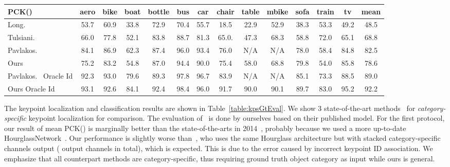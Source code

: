 \documentclass[runningheads]{llncs}
\begin{document}
\begin{center}
\begin{table*}[t]
\scriptsize
\centering
\begin{tabular}{l|cccccccccccc|c}
\hline
PCK() & {{}aero} & {{}bike} & {{}boat} & {{}bottle} & {{}bus} & {{}car} & {{}chair} & {{}table} & {{}mbike} & {{}sofa} & {{}train} & { {}tv} & {mean} \\
\hline
{{}{Long. \cite{long2014convnets}}} & 53.7 & 60.9 & 33.8 & 72.9 & 70.4 & 55.7 & 18.5 & 22.9 & 52.9 & 38.3 & 53.3 & 49.2 & 48.5 \\
{Tulsiani.~\cite{tulsiani2015viewpoints}} & 66.0 & 77.8 & 52.1 & 83.8 & 88.7 & 81.3 & 65.0.& 47.3 & 68.3 & 58.8 & 72.0 & 65.1 & 68.8 \\
{Pavlakos.~\cite{pavlakos20176}} & 84.1 & 86.9 & 62.3 & 87.4 & 96.0 & 93.4 & 76.0 & N/A & N/A & 78.0 & 58.4 & 84.8 & 82.5 \\
Ours & 75.2 & 83.2 & 54.8 & 87.0 & 94.4 & 90.0 & 75.4 & 58.0 & 68.8 & 79.8 & 54.0 & 85.8 & 78.6 \\
\hline
\hline
{Pavlakos.~\cite{pavlakos20176} Oracle Id} & 92.3 & 93.0 & 79.6 & 89.3 & 97.8 & 96.7 & 83.9 & N/A & N/A & 85.1 & 73.3 & 88.5 & 89.0 \\
Ours Oracle Id & 93.1 & 92.6 & 84.1 & 92.4 & 98.4 & 96.0 & 91.7 & 90.0 & 90.1 & 89.7 & 83.0 & 95.2 & 92.2 \\
\hline
\end{tabular}
\caption{2D Keypoint Localization Results. The results are shown in PCK(). Top: our result with nearest canonical feature as keypoint identification. Bottom: results with oracle keypoint identification.}
\label{table:kpsGtEval}
\end{table*}
\end{center}

The keypoint localization and classification results are shown in Table~\ref{table:kpsGtEval}.
We show 3 state-of-the-art methods~\cite{long2014convnets,tulsiani2015viewpoints,pavlakos20176} for \emph{category-specific} keypoint localization for comparison. 
The evaluation of~\cite{pavlakos20176} is done by ourselves based on their published model. 
For the first protocol, 
our result of  mean PCK() is marginally better than the state-of-the-arts in 2014~\cite{long2014convnets,tulsiani2015viewpoints}, probably because we used a more up-to-date HourglassNetwork~\cite{newell2016stacked}. 
Our performance is slightly worse than~\cite{pavlakos20176}, who uses the same Hourglass architecture but with stacked category-specific channels output ( output channels in total), which is expected.
This is due to the error caused by incorrect keypoint ID association. 
We emphasize that all counterpart methods are category-specific, thus requiring ground truth object category as input while ours is general. 
\end{document}
